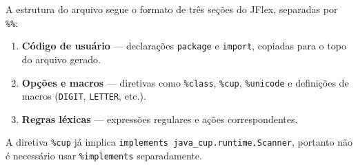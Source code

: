 \documentclass[a4paper,12pt]{article}
\begin{document}
A estrutura do arquivo segue o formato de três seções do JFlex, separadas por \texttt{\%\%}:
\begin{enumerate}
  \item \textbf{Código de usuário} — declarações \texttt{package} e \texttt{import}, copiadas para o topo do arquivo gerado.
  \item \textbf{Opções e macros} — diretivas como \texttt{\%class}, \texttt{\%cup}, \texttt{\%unicode} e definições de macros (\texttt{DIGIT}, \texttt{LETTER}, etc.).
  \item \textbf{Regras léxicas} — expressões regulares e ações correspondentes.
\end{enumerate}

A diretiva \texttt{\%cup} já implica \texttt{implements java\_cup.runtime.Scanner}, portanto não é necessário usar \texttt{\%implements} separadamente.
\end{document}
